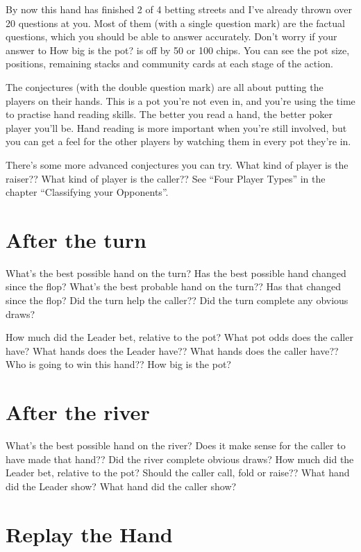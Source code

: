 By now this hand has finished 2 of 4 betting streets and I've already
thrown over 20 questions at you. Most of them (with a single
question mark) are the factual questions, which you
should be able to answer accurately. Don't worry if your answer to How
big is the pot? is off by 50 or 100 chips. You can see the pot size,
positions, remaining stacks and community cards at each stage of the
action.

The conjectures (with the double question mark)
are all about putting the players on their hands. This is
a pot you're not even in, and you're using the time to practise hand reading
skills. The better you read a hand, the better poker player you'll be.
Hand reading is more important when you're still involved, but you can get
a feel for the other players by watching them in every pot they're in.

There's some more advanced conjectures you can try. What kind of player
is the raiser?? What kind of player is the caller?? See ``Four Player Types''
in the chapter ``Classifying your Opponents''.

\section{After the turn}

What's the best possible hand on the turn? Has the best possible hand
changed since the flop? What's the best probable hand on the turn??
Has that changed since the flop? Did the turn help the caller?? Did
the turn complete any obvious draws?

How much did the Leader bet, relative to the pot? What pot odds does
the caller have? What hands does the Leader have?? What hands does the
caller have?? Who is going to win this hand?? How big is the pot?

\section{After the river}

What's the best possible hand on the river? Does it make sense for the
caller to have made that hand?? Did the river complete obvious draws?
How much did the Leader bet, relative
to the pot? Should the caller call, fold or raise?? What hand did
the Leader show? What hand did the caller show?

\section{Replay the Hand}

